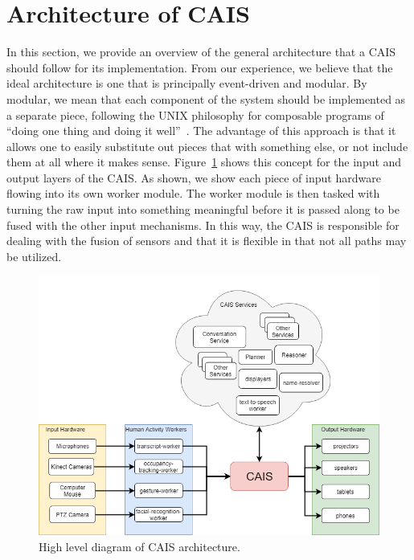 \section{Architecture of CAIS}\label{sec:cais_architecture}

In this section, we provide an overview of the general architecture that a
CAIS should follow for its implementation. From our experience, we believe
that the ideal architecture is one that is principally event-driven and
modular. By modular, we mean that each component of the system
should be implemented as a separate piece, following the UNIX philosophy for composable programs of 
``doing one thing and doing it well''~\cite{mcilroy_unix_1978}. The advantage of
this approach is that it allows one to easily substitute out pieces that with
something else, or not include them at all where it makes sense.
Figure~\ref{fig:cais_high_level} shows this concept for the input and output
layers of the CAIS. As shown, we show each piece of input hardware flowing
into its own worker module. The worker module is then tasked with turning the
raw input into something meaningful before it is passed along to be fused
with the other input mechanisms. In this way, the CAIS is responsible for
dealing with the fusion of sensors and that it is flexible in that not
all paths may be utilized.

\begin{figure}
    \centering
    \includegraphics[width=0.5\columnwidth]{chapters/02_technology/figures/cais_high_level.png}
    \caption{High level diagram of CAIS architecture.}
    \label{fig:cais_high_level}
\end{figure}

